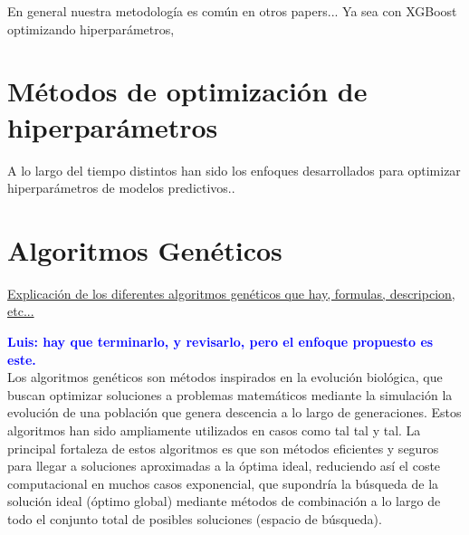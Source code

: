 \documentclass{uathesis-es}
\begin{document}





En general nuestra metodología es común en otros papers... Ya sea con XGBoost optimizando hiperparámetros, 

\section{Métodos de optimización de hiperparámetros}
\label{HYPERPARAMETERS_OPTIMIZATION_METHODS}

A lo largo del tiempo distintos han sido los enfoques desarrollados para optimizar hiperparámetros de modelos predictivos.. \cite{bischl2023hyperparameter}

\section{Algoritmos Genéticos}
\underline{Explicación de los diferentes algoritmos genéticos que hay, formulas, descripcion, etc...}

\textcolor{blue}{\textbf{Luis: hay que terminarlo, y revisarlo, pero el enfoque propuesto es este.}}\\


Los algoritmos genéticos son métodos inspirados en la evolución biológica, que buscan optimizar soluciones a problemas matemáticos mediante la simulación la evolución de una población que genera descencia a lo largo de generaciones. Estos algoritmos han sido ampliamente utilizados en casos como tal tal y tal. La principal fortaleza de estos algoritmos es que son métodos eficientes y seguros para llegar a soluciones aproximadas a la óptima ideal, reduciendo así el coste computacional en muchos casos exponencial, que supondría la búsqueda de la solución ideal (óptimo global) mediante métodos de combinación a lo largo de todo el conjunto total de posibles soluciones (espacio de búsqueda).
\end{document}
